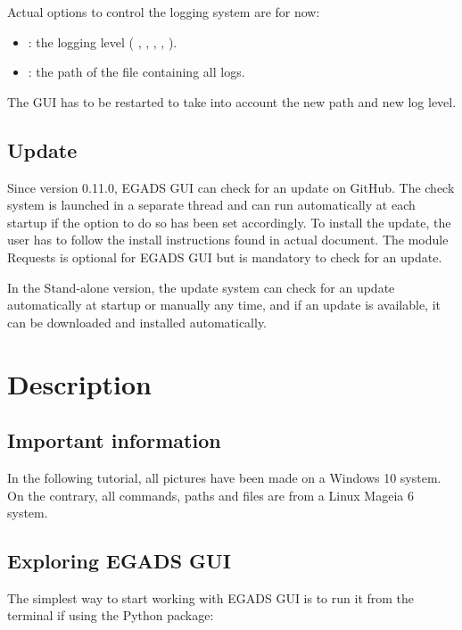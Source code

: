 \documentclass[a4paper,10pt,openany,english]{sphinxmanual}
\begin{document}
Actual options to control the logging system are for now:
\begin{itemize}
\item {} 
: the logging level ( , , , ,  ).

\item {} 
: the path of the file containing all logs.

\end{itemize}

The GUI has to be restarted to take into account the new path and new log level.


\section{Update}
\label{\detokenize{install:update}}
Since version 0.11.0, EGADS GUI can check for an update on GitHub. The check system is launched in a separate thread and can run automatically at each startup if the option to do so has been set accordingly. To install the update, the user has to follow the install instructions found in actual document. The module Requests is optional for EGADS GUI but is mandatory to check for an update.

In the Stand-alone version, the update system can check for an update automatically at startup or manually any time, and if an update is available, it can be downloaded and installed automatically.


\chapter{Description}
\label{\detokenize{description:description}}\label{\detokenize{description::doc}}

\section{Important information}
\label{\detokenize{description:important-information}}
In the following tutorial, all pictures have been made on a Windows 10 system. On the contrary, all commands, paths and files are from a Linux Mageia 6 system.


\section{Exploring EGADS GUI}
\label{\detokenize{description:exploring-egads-gui}}
The simplest way to start working with EGADS GUI is to run it from the terminal if using the Python package:
\end{document}
